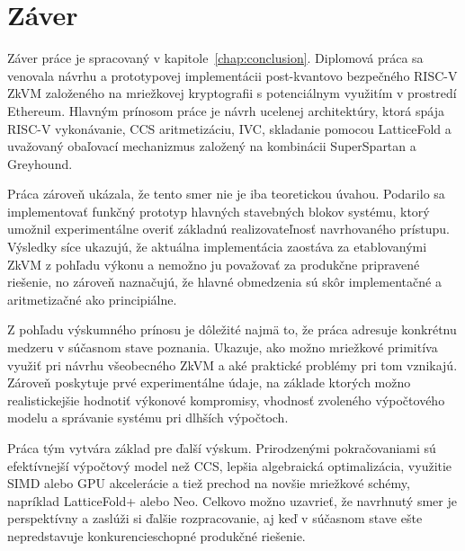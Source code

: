 \section{Záver}

Záver práce je spracovaný v kapitole~\ref{chap:conclusion}. Diplomová práca sa
venovala návrhu a prototypovej implementácii post-kvantovo bezpečného RISC-V
ZkVM založeného na mriežkovej kryptografii s potenciálnym využitím v prostredí
Ethereum. Hlavným prínosom práce je návrh ucelenej architektúry, ktorá spája
RISC-V vykonávanie, CCS aritmetizáciu, IVC, skladanie pomocou LatticeFold a
uvažovaný obaľovací mechanizmus založený na kombinácii SuperSpartan a
Greyhound.

Práca zároveň ukázala, že tento smer nie je iba teoretickou úvahou. Podarilo sa
implementovať funkčný prototyp hlavných stavebných blokov systému, ktorý
umožnil experimentálne overiť základnú realizovateľnosť navrhovaného prístupu.
Výsledky síce ukazujú, že aktuálna implementácia zaostáva za etablovanými ZkVM
z pohľadu výkonu a nemožno ju považovať za produkčne pripravené riešenie, no
zároveň naznačujú, že hlavné obmedzenia sú skôr implementačné a aritmetizačné
ako principiálne.

Z pohľadu výskumného prínosu je dôležité najmä to, že práca adresuje konkrétnu
medzeru v súčasnom stave poznania. Ukazuje, ako možno mriežkové primitíva
využiť pri návrhu všeobecného ZkVM a aké praktické problémy pri tom vznikajú.
Zároveň poskytuje prvé experimentálne údaje, na základe ktorých možno
realistickejšie hodnotiť výkonové kompromisy, vhodnosť zvoleného výpočtového
modelu a správanie systému pri dlhších výpočtoch.

Práca tým vytvára základ pre ďalší výskum. Prirodzenými pokračovaniami sú
efektívnejší výpočtový model než CCS, lepšia algebraická optimalizácia,
využitie SIMD alebo GPU akcelerácie a tiež prechod na novšie mriežkové schémy,
napríklad LatticeFold+ alebo Neo. Celkovo možno uzavrieť, že navrhnutý smer je
perspektívny a zaslúži si ďalšie rozpracovanie, aj keď v súčasnom stave ešte
nepredstavuje konkurencieschopné produkčné riešenie.
